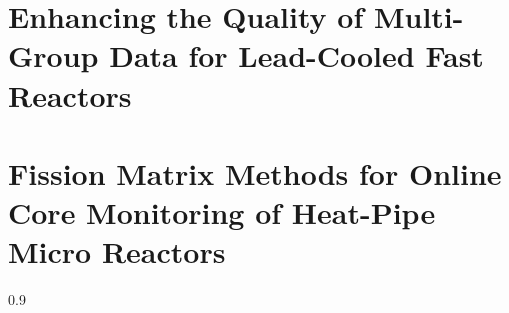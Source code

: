 \documentclass[a4paper,12pt,times,authoryear,print,index,custommargin]{Classes/PhDThesisPSnPDF}
\begin{document}
\frontmatter

\maketitle







\tableofcontents

\listoffigures

\listoftables

\printnomenclature


\mainmatter



\part{Enhancing the Quality of Multi-Group Data for Lead-Cooled Fast Reactors}\label{part:lfr}


\part{Fission Matrix Methods for Online Core Monitoring of Heat-Pipe Micro Reactors}\label{part:hpmr}




\begin{spacing}{0.9}

\cleardoublepage


\end{spacing}
\end{document}

